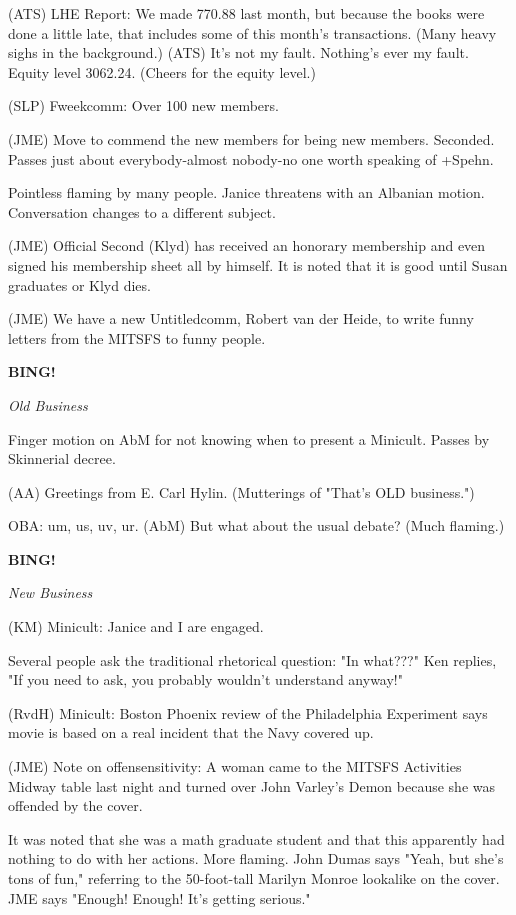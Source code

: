\documentclass[12pt]{article}
\newcommand{\bing}{{\bf BING!} }
\newcommand{\goto}[1]{\bing \vskip 12pt \centerline{{\em{#1}}}}
\begin{document}
(ATS) LHE Report: We made 770.88 last month, but because the books were done a little late, that includes some of this month's transactions. (Many heavy sighs in the background.) (ATS) It's not my fault. Nothing's ever my fault. Equity level 3062.24. (Cheers for the equity level.)

(SLP) Fweekcomm: Over 100 new members.

(JME) Move to commend the new members for being new members. Seconded. Passes just about everybody-almost nobody-no one worth speaking of +Spehn.

Pointless flaming by many people. Janice threatens with an Albanian motion. Conversation changes to a different subject.

(JME) Official Second (Klyd) has received an honorary membership and even signed his membership sheet all by himself. It is noted that it is good until Susan graduates or Klyd dies.

(JME) We have a new Untitledcomm, Robert van der Heide, to write funny letters from the MITSFS to funny people.

\goto{Old Business}

Finger motion on AbM for not knowing when to present a Minicult. Passes by Skinnerial decree.

(AA) Greetings from E. Carl Hylin. (Mutterings of "That's OLD business.")

OBA: um, us, uv, ur. (AbM) But what about the usual debate? (Much flaming.)

\goto{New Business}

(KM) Minicult: Janice and I are engaged.

Several people ask the traditional rhetorical question: "In what???" Ken replies, "If you need to ask, you probably wouldn't understand anyway!"

(RvdH) Minicult: Boston Phoenix review of the Philadelphia Experiment says movie is based on a real incident that the Navy covered up.

(JME) Note on offensensitivity: A woman came to the MITSFS Activities Midway table last night and turned over John Varley's Demon because she was offended by the cover.

It was noted that she was a math graduate student and that this apparently had nothing to do with her actions. More flaming. John Dumas says "Yeah, but she's tons of fun," referring to the 50-foot-tall Marilyn Monroe lookalike on the cover. JME says "Enough! Enough! It's getting serious."
\end{document}
